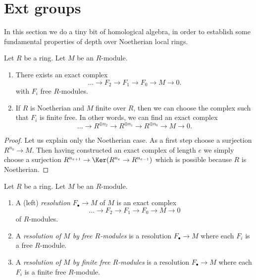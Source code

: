 \section{Ext groups}
\label{section-ext}

\noindent
In this section we do a tiny bit of homological algebra,
in order to establish some fundamental properties of
depth over Noetherian local rings.

\begin{lemma}
\label{lemma-resolution-by-finite-free}
Let $R$ be a ring. Let $M$ be an $R$-module.
\begin{enumerate}
\item There exists an exact complex
$$
\ldots \to F_2 \to F_1 \to F_0 \to M \to 0.
$$
with $F_i$ free $R$-modules.
\item If $R$ is Noetherian and $M$ finite over $R$, then we
can choose the complex such that $F_i$ is finite free.
In other words, we can find an exact complex
$$
\ldots \to R^{\oplus n_2} \to R^{\oplus n_1} \to R^{\oplus n_0} \to M \to 0.
$$
\end{enumerate}
\end{lemma}

\begin{proof}
Let us explain only the Noetherian case.
As a first step choose a surjection $R^{n_0} \to M$.
Then having constructed an exact complex of length
$e$ we simply choose a surjection $R^{n_{e + 1}} \to
\Ker(R^{n_e} \to R^{n_{e-1}})$ which is possible
because $R$ is Noetherian.
\end{proof}

\begin{definition}
\label{definition-finite-free-resolution}
Let $R$ be a ring. Let $M$ be an $R$-module.
\begin{enumerate}
\item A (left) {\it resolution} $F_\bullet \to M$ of $M$ is an exact complex
$$
\ldots \to F_2 \to F_1 \to F_0 \to M \to 0
$$
of $R$-modules.
\item A {\it resolution of $M$ by free $R$-modules} is a resolution
$F_\bullet \to M$ where each $F_i$ is a free $R$-module.
\item A {\it resolution of $M$ by finite free $R$-modules} is a resolution
$F_\bullet \to M$ where each $F_i$ is a finite free $R$-module.
\end{enumerate}
\end{definition}

